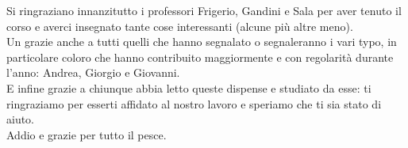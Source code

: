 Si ringraziano innanzitutto i professori Frigerio, Gandini e Sala per aver tenuto il corso e averci insegnato tante cose interessanti (alcune più altre meno). \\
Un grazie anche a tutti quelli che hanno segnalato o segnaleranno i vari typo, in particolare coloro che hanno contribuito maggiormente e con regolarità durante l'anno: Andrea, Giorgio e Giovanni. \\
E infine grazie a chiunque abbia letto queste dispense e studiato da esse: ti ringraziamo per esserti affidato al nostro lavoro e speriamo che ti sia stato di aiuto. \\
Addio e grazie per tutto il pesce.
